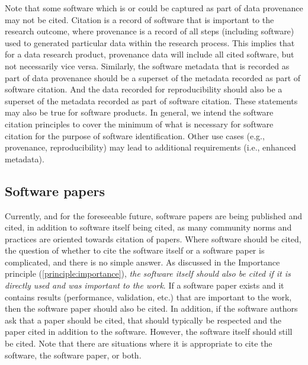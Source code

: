 \documentclass[11pt, oneside]{amsart}
\newcommand{\dmnote}[1]{ {\textcolor{purple} { ***DM: #1 }}} %
\newcommand{\ssnote}[1]{ {\textcolor{bondiblue} { ***SS: #1}}} %
\begin{document}
Note that some software which is or could be captured as part of data provenance may not be cited.
Citation is a record of software that is important to the research outcome, where provenance is a record of all steps (including software) used to generated particular data within the research process.
This implies that for a data research product, provenance data will include all cited software, but not necessarily vice versa.
Similarly, the software metadata that is recorded as part of data provenance should be a superset of the metadata recorded as part of software citation.
And the data recorded for reproducibility should also be a superset of the metadata recorded as part of software citation.
These statements may also be true for software products.
In general, we intend the software citation principles to cover the minimum of what is necessary for software citation for the purpose of software identification.
Other use cases (e.g., provenance, reproducibility) may lead to additional requirements (i.e., enhanced metadata).

\subsection{Software papers} \label{sec:software_papers}

Currently, and for the foreseeable future, software papers are being published and cited,
in addition to software itself being cited, as many community norms and practices are
oriented towards citation of papers.
Where software should be cited, the question of whether to cite the software itself or a software paper is
complicated, and there is no simple answer.
As discussed in the Importance principle (\ref{principle:importance}), \textit{the software
itself should also be cited if it is directly used and was important to the work}.
If a software paper exists and it contains results (performance, validation, etc.) that are
important to the work, then the software paper should also be cited.
In addition, if the software authors ask that a paper should be cited, that should typically be respected and the paper cited in addition to the software.
However, the software itself should still be cited.
Note that there are situations where it is appropriate to cite the software, the software paper, or both.
\end{document}
